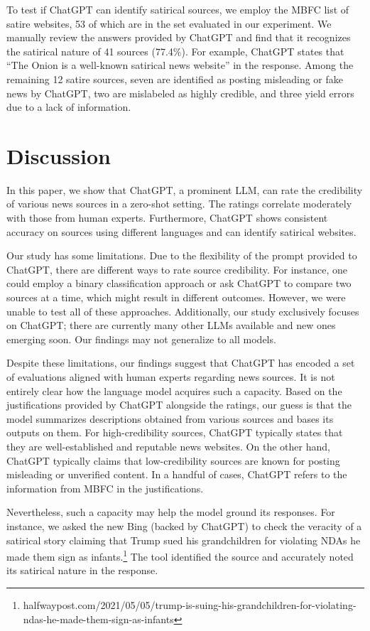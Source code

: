 \documentclass{article}
\begin{document}
To test if ChatGPT can identify satirical sources, we employ the MBFC list of satire websites, 53 of which are in the set evaluated in our experiment.
We manually review the answers provided by ChatGPT and find that it recognizes the satirical nature of 41 sources  (77.4\%).
For example, ChatGPT states that ``The Onion is a well-known satirical news website'' in the response.
Among the remaining 12 satire sources, seven are identified as posting misleading or fake news by ChatGPT, two are mislabeled as highly credible, and three yield errors due to a lack of information.

\section{Discussion}

In this paper, we show that ChatGPT, a prominent LLM, can rate the credibility of various news sources in a zero-shot setting.
The ratings correlate moderately with those from human experts.
Furthermore, ChatGPT shows consistent accuracy on sources using different languages and can identify satirical websites.

Our study has some limitations.
Due to the flexibility of the prompt provided to ChatGPT, there are different ways to rate source credibility.
For instance, one could employ a binary classification approach or ask ChatGPT to compare two sources at a time, which might result in different outcomes.
However, we were unable to test all of these approaches.
Additionally, our study exclusively focuses on ChatGPT; there are currently many other LLMs available and new ones emerging soon. 
Our findings may not generalize to all models.

Despite these limitations, our findings suggest that ChatGPT has encoded a set of evaluations aligned with human experts regarding news sources.
It is not entirely clear how the language model acquires such a capacity.
Based on the justifications provided by ChatGPT alongside the ratings, our guess is that the model summarizes descriptions obtained from various sources and bases its outputs on them.
For high-credibility sources, ChatGPT typically states that they are well-established and reputable news websites.
On the other hand, ChatGPT typically claims that low-credibility sources are known for posting misleading or unverified content.
In a handful of cases, ChatGPT refers to the information from MBFC in the justifications.

Nevertheless, such a capacity may help the model ground its responses.
For instance, we asked the new Bing (backed by ChatGPT) to check the veracity of a satirical story claiming that Trump sued his grandchildren for violating NDAs he made them sign as infants.\footnote{halfwaypost.com/2021/05/05/trump-is-suing-his-grandchildren-for-violating-ndas-he-made-them-sign-as-infants}
The tool identified the source and accurately noted its satirical nature in the response.
\end{document}
